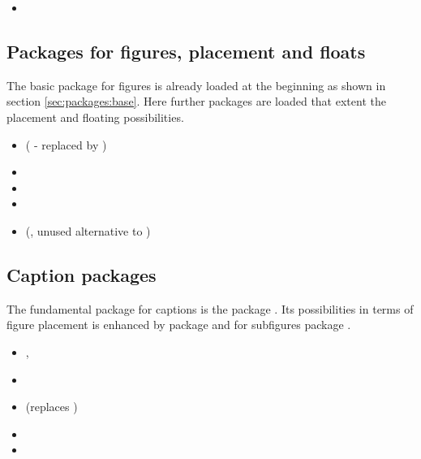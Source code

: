 \begin{itemize}[noitemsep]
\item {}
\end{itemize}


\subsection{Packages for figures, placement and floats}
The basic package  for figures is already loaded at the beginning as shown in section \ref{sec:packages:base}. Here further packages are loaded that extent the placement and floating possibilities.

\begin{itemize}[noitemsep]
\item (  - replaced by )
\item {}
\item {}
\item {}
\item (, unused alternative to )
\end{itemize}


\subsection{Caption packages}

The fundamental package for captions is the package .  Its possibilities in terms of figure placement is enhanced by package  and for subfigures package .

\begin{itemize}[noitemsep]
\item {}, 
\item {}
\item {} (replaces )
\item {}
\item {}
\end{itemize}

